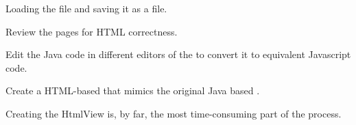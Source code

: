 \begin{numberlist}

  \item Loading the  file and saving it as a  file.
  \item Review the  pages for HTML correctness.
  \item Edit the Java code in different editors of the  to convert it to equivalent Javascript code.
  \item Create a HTML-based  that mimics the original Java based .
\end{numberlist}

\noindent Creating the HtmlView is, by far, the most time-consuming part of the process.





